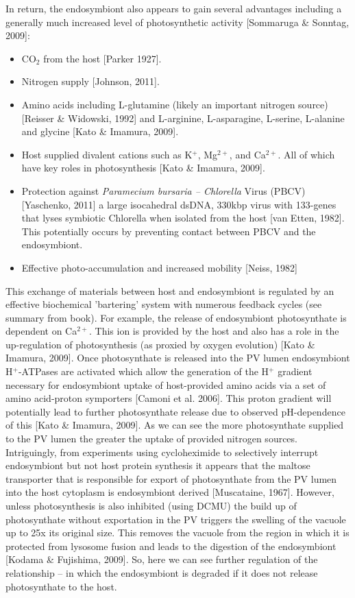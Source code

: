 In return, the endosymbiont also appears to gain several advantages including a generally much increased level of photosynthetic activity [Sommaruga \& Sonntag, 2009]:
\begin{itemize}
  \item CO$_{2}$ from the host [Parker 1927].
  \item Nitrogen supply [Johnson, 2011].
  \item Amino acids including L-glutamine (likely an important nitrogen source) [Reisser \& Widowski, 1992] and L-arginine, L-asparagine, L-serine, L-alanine and glycine [Kato \& Imamura, 2009].
  \item Host supplied divalent cations such as K$^{+}$, Mg$^{2+}$, and Ca$^{2+}$. All of which have key roles in photosynthesis [Kato \& Imamura, 2009].
  \item Protection against \textit{Paramecium bursaria – Chlorella} Virus (PBCV) [Yaschenko, 2011] a large isocahedral dsDNA, 330kbp virus with 133-genes that lyses symbiotic Chlorella when isolated from the host [van Etten, 1982].  This potentially occurs by preventing contact between PBCV and the endosymbiont.
  \item Effective photo-accumulation and increased mobility [Neiss, 1982]  
\end{itemize}

This exchange of materials between host and endosymbiont is regulated by an effective biochemical 'bartering' system with numerous feedback cycles (see summary from book).
For example, the release of endosymbiont photosynthate is dependent on Ca$^{2+}$.  
This ion is provided by the host and also has a role in the up-regulation of photosynthesis (as proxied by oxygen evolution) [Kato \& Imamura, 2009].     
Once photosynthate is released into the PV lumen endosymbiont H$^{+}$-ATPases are activated which allow the generation of the H$^{+}$ gradient necessary for endosymbiont uptake of host-provided amino acids via a set of amino acid-proton symporters [Camoni et al. 2006].  
This proton gradient will potentially lead to further photosynthate release due to observed pH-dependence of this [Kato \& Imamura, 2009]. 
As we can see the more photosynthate supplied to the PV lumen the greater the uptake of provided nitrogen sources.  
Intriguingly, from experiments using cycloheximide to selectively interrupt endosymbiont but not host protein synthesis it appears that the maltose transporter that is responsible for export of photosynthate from the PV lumen into the host cytoplasm is endosymbiont derived [Muscataine, 1967]. 
However, unless photosynthesis is also inhibited (using DCMU) the build up of photosynthate without exportation in the PV triggers the swelling of the vacuole up to 25x its original size.  
This removes the vacuole from the region in which it is protected from lysosome fusion and leads to the digestion of the endosymbiont [Kodama \& Fujishima, 2009]. 
So, here we can see further regulation of the relationship – in which the endosymbiont is degraded if it does not release photosynthate to the host.

